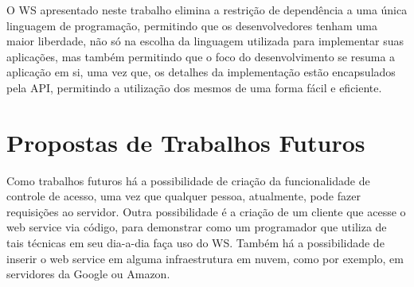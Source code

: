 \documentclass[12pt]{article}
\begin{document}

O WS apresentado neste trabalho elimina a restrição de dependência a uma
única linguagem de programação, permitindo que os desenvolvedores tenham uma maior
liberdade, não só na escolha da linguagem utilizada para implementar suas aplicações,
mas também permitindo que o foco do desenvolvimento se resuma a aplicação em si,
uma vez que, os detalhes da implementação estão encapsulados pela API,
permitindo a utilização dos mesmos de uma forma fácil e eficiente.

\section{Propostas de Trabalhos Futuros}

Como trabalhos futuros há a possibilidade de criação da funcionalidade de controle de acesso, uma vez que qualquer pessoa, atualmente, pode fazer requisições ao servidor. Outra possibilidade é a criação de um cliente que acesse o web service via código, para demonstrar como um programador que utiliza de tais técnicas em seu dia-a-dia faça uso do WS. Também há a possibilidade de inserir o web service em alguma infraestrutura em nuvem, como por exemplo, em servidores da Google ou Amazon.




\end{document}
